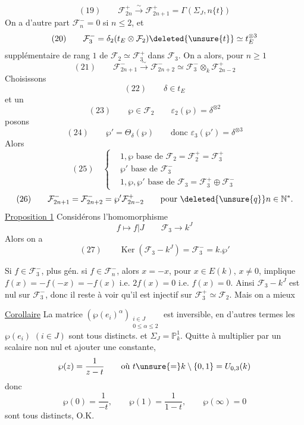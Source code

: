 \[
(19)\qquad\mathcal F_{2n}^+\xrightarrow{\sim}\mathcal F_{2n+1}^+
=\Gamma(\Sigma_J,n\{t\})
\]
On a d'autre part $\mathcal F_n^-=0$ si $n\leq2$, et
\[
(20)\qquad\mathcal F_3^-=\delta_2(t_E\otimes\mathcal F_2)\deleted{\unsure{t}}\simeq t_E^{\otimes3}
\]
supplémentaire de rang $1$ de $\mathcal F_2\simeq\mathcal F_3^+$ dans $\mathcal F_3$.
On a alors, pour  $n\geq1$
\[
(21)\qquad\mathcal F_{2n+1}^-\xrightarrow{\sim}\mathcal F_{2n+2}^-
\simeq\mathcal F_3^-\otimes_k\mathcal F_{2n-2}^+
\]
Choisissons
\[
(22)\qquad\delta\in t_E
\]
et un
\[
(23)\qquad\wp\in\mathcal F_2\qquad\varepsilon_2(\wp)=\delta^{\otimes2}
\]
posons
\[
(24)\qquad\wp'=\Theta_\delta(\wp)\qquad\text{donc }\varepsilon_3(\wp')=\delta^{\otimes3}
\]
Alors
\[
(25)\quad\left\{\begin{aligned}
&1,\wp\text{ base de }\mathcal F_2=\mathcal F_2^+=\mathcal F_3^+\\
&\wp'\text{ base de }\mathcal F_3^-\\
&1,\wp,\wp'\text{ base de }\mathcal F_3=\mathcal F_3^+\oplus\mathcal F_3^-
\end{aligned}\right.
\]
\[
(26)\qquad\mathcal F_{2n+1}^-=\mathcal F_{2n+2}^-=\wp'\mathcal F_{2n-2}^+
\qquad\text{pour }\deleted{\unsure{q}}n\in\mathbb N^*.
\]
\uline{Proposition 1} Considérons l'homomorphisme
\[
f\longmapsto f|J\qquad\mathcal F_3\longrightarrow k^J
\]
Alors on a
\[
(27)\qquad\operatorname{Ker}(\mathcal F_3\mathbin{-}k^J)=\mathcal F_3^-=k.\wp'
\]

Si $f\in\mathcal F_3^-$, plus gén. si $f\in\mathcal F_n^-$, alors
$x=-x$, pour $x\in E(k)$, $x\ne0$, implique $f(x)=-f(-x)=-f(x)$
i.e. $2f(x)=0$ i.e. $f(x)=0$. Ainsi $\mathcal F_3\mathbin{-}k^J$ est nul
sur $\mathcal F_3^-$, donc il reste à voir qu'il est
injectif sur $\mathcal F_3^+\simeq\mathcal F_2$. Mais on a mieux

\uline{Corollaire} La matrice 
$(\wp(e_i)^\alpha)_{\substack{i\in J\\0\leq\alpha\leq2}}$ est
inversible, en d'autres termes les $\wp(e_i)$ $(i\in J)$
sont tous distincts.
 
et $\Sigma_J=\mathbb P^1_k$. Quitte à multiplier par un
scalaire non nul et ajouter une constante,
\[
\wp(z)=\frac1{z-t}\qquad\text{où }t\unsure{=}k\setminus\{0,1\}=U_{0,3}(k)
\]
donc
\[
\wp(0)=\frac1{-t},\qquad\wp(1)=\frac1{1-t},\qquad\wp(\infty)=0
\]
sont tous distincts, O.K.

